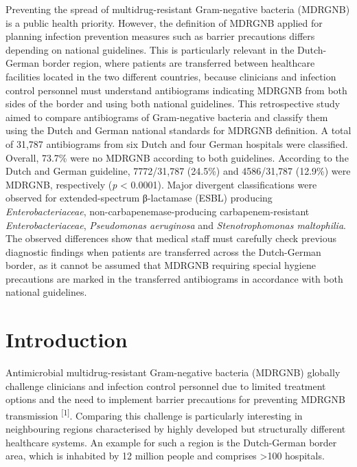 \documentclass[
]{book}
\begin{document}
Preventing the spread of multidrug-resistant Gram-negative bacteria (MDRGNB) is a public health priority. However, the definition of MDRGNB applied for planning infection prevention measures such as barrier precautions differs depending on national guidelines. This is particularly relevant in the Dutch-German border region, where patients are transferred between healthcare facilities located in the two different countries, because clinicians and infection control personnel must understand antibiograms indicating MDRGNB from both sides of the border and using both national guidelines. This retrospective study aimed to compare antibiograms of Gram-negative bacteria and classify them using the Dutch and German national standards for MDRGNB definition. A total of 31,787 antibiograms from six Dutch and four German hospitals were classified. Overall, 73.7\% were no MDRGNB according to both guidelines. According to the Dutch and German guideline, 7772/31,787 (24.5\%) and 4586/31,787 (12.9\%) were MDRGNB, respectively (\emph{p} \textless{} 0.0001). Major divergent classifications were observed for extended-spectrum β-lactamase (ESBL) producing \emph{Enterobacteriaceae}, non-carbapenemase-producing carbapenem-resistant \emph{Enterobacteriaceae}, \emph{Pseudomonas aeruginosa} and \emph{Stenotrophomonas maltophilia}. The observed differences show that medical staff must carefully check previous diagnostic findings when patients are transferred across the Dutch-German border, as it cannot be assumed that MDRGNB requiring special hygiene precautions are marked in the transferred antibiograms in accordance with both national guidelines.

\hypertarget{introduction-5}{%
\section{Introduction}\label{introduction-5}}

Antimicrobial multidrug-resistant Gram-negative bacteria (MDRGNB) globally challenge clinicians and infection control personnel due to limited treatment options and the need to implement barrier precautions for preventing MDRGNB transmission \textsuperscript{{[}1{]}}. Comparing this challenge is particularly interesting in neighbouring regions characterised by highly developed but structurally different healthcare systems. An example for such a region is the Dutch-German border area, which is inhabited by 12 million people and comprises \textgreater100 hospitals.
\end{document}
